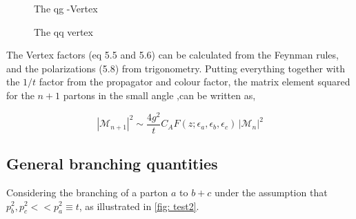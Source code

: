 \documentclass[main.tex]{subfiles}
\begin{document}
\begin{figure}[H]
    \centering
    \begin{minipage}{.5\textwidth}
    \centering
        \caption{The qg -Vertex}
        \label{fig: feynman_gqq-vertex}
  \label{fig:test1}
\end{minipage}%
\begin{minipage}{.5\textwidth}
    \centering
        \caption{The qq vertex}
        \label{eqn: feynman_qqg-vertex}
\end{minipage}
\end{figure}



The Vertex factors (eq 5.5 and 5.6) can be calculated from the Feynman rules, and the polarizations (5.8) from trigonometry. Putting everything together with the \(1/t\) factor from the propagator and colour factor, the matrix element squared for the \(n+1\) partons in the small angle ,can be written as, 

\begin{equation}
    |\mathcal{M}_{n+1}|^2 \sim \frac{4g^2}{t} C_A F(z;\epsilon_a,\epsilon_b,\epsilon_c) \, |\mathcal{M}_n|^2
\end{equation}



\subsection{General branching quantities}
Considering the branching of a parton \(a\) to \(b+c\) under the assumption that \(p_b^2, p_c^2 << p_a^2 \equiv t\), as illustrated in \autoref{fig: test2}.
\end{document}

